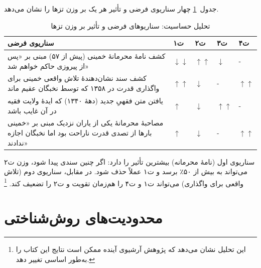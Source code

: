 \documentclass[12pt,a4paper]{book}
\begin{document}
جدول~\ref{tab:sensitivity} چهار سناریوی فرضی و
تأثیر هر یک بر وزن تزها را نشان می‌دهد.

{%
\small
\begin{longtable}{%
  >{\arraybackslash}m{5cm}
  >{\centering\arraybackslash}m{1.5cm}
  >{\centering\arraybackslash}m{1.5cm}
  >{\centering\arraybackslash}m{1.5cm}
  >{\centering\arraybackslash}m{1.5cm}}
\caption{تحلیل حساسیت: سناریوهای فرضی و تأثیر بر وزن تزها}
\label{tab:sensitivity} \\
\toprule
\textbf{سناریوی فرضی}
  & \cellcolor{cGreen!15}\textbf{ت‌۱}
  & \cellcolor{cAccent!15}\textbf{ت‌۲}
  & \cellcolor{cGold!15}\textbf{ت‌۳}
  & \cellcolor{cConsolid!15}\textbf{ت‌۴} \\
\midrule
\endfirsthead
\bottomrule
\endlastfoot

کشف نامهٔ محرمانهٔ خمینی (پیش از ۵۷) مبنی بر «پس از پیروزی حاکم خواهم شد»
  & $\downarrow\downarrow$
  & $\uparrow\uparrow$
  & $\downarrow$
  & - \\
\addlinespace

کشف سند نشان‌دهندهٔ تلاش واقعی خمینی برای واگذاری قدرت در ۱۳۵۸ که توسط نخبگان عقیم ماند
  & $\uparrow\uparrow$
  & $\downarrow$
  & -
  & $\uparrow\uparrow$ \\
\addlinespace

یافتن متن فقهیِ جدید (دههٔ ۱۳۴۰) که ایدهٔ ولایت فقیه در آن غایب باشد
  & $\uparrow$
  & $\downarrow$
  & $\uparrow\uparrow$
  & - \\
\addlinespace

مصاحبهٔ محرمانهٔ یکی از یاران نزدیک مبنی بر «خمینی بارها از تصدی قدرت ناراحت بود اما نخبگان اجازه ندادند»
  & $\uparrow$
  & $\downarrow$
  & -
  & $\uparrow\uparrow$ \\

\end{longtable}
}

\begin{noteBox}
سناریوی اول (نامهٔ محرمانه) بیشترین تأثیر را دارد:
اگر چنین سندی پیدا شود،
وزن ت‌۲ می‌تواند به بیش از ۵۰٪ برسد
و ت‌۱ عملاً حذف شود.
در مقابل، سناریوی دوم (تلاش واقعی برای واگذاری)
می‌تواند ت‌۱ و ت‌۴ را هم‌زمان تقویت
و ت‌۲ را تضعیف کند.%
\footnote{این تحلیل نشان می‌دهد که پژوهش آرشیوی آینده
ممکن است نتایج این کتاب را به‌طور اساسی تغییر دهد.}
\end{noteBox}

\section{محدودیت‌های روش‌شناختی}
\label{sec:ch15-limitations}
\end{document}
